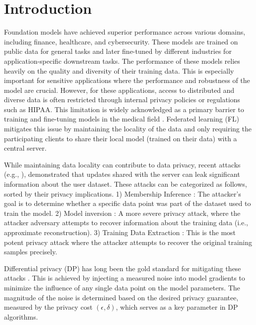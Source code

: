 \section{Introduction}
Foundation models have achieved superior performance across various domains, including finance, healthcare, and cybersecurity. 
%
These models are trained on public data for general tasks and later fine-tuned by different industries for application-specific downstream tasks. 
The performance of these models relies heavily on the quality and diversity of their training data.
%
This is especially important for sensitive applications where the performance and robustness of the model are crucial.
%
However, for these applications, access to distributed and diverse data is often restricted through internal privacy policies or regulations such as HIPAA. 
%
This limitation is widely acknowledged as a primary barrier to training and fine-tuning models in the medical field \cite{liu2024moe}. 
%
Federated learning (FL) mitigates this issue by maintaining the locality of the data and only requiring the participating clients to share their local model (trained on their data) with a central server. 
%

While maintaining data locality can contribute to data privacy, recent attacks (e.g., \cite{balle2022reconstructing,hayes2024bounding}), demonstrated that updates shared with the server can leak significant information about the user dataset. 
%
These attacks can be categorized as follows, sorted by their privacy implications.
%
1) Membership Inference \cite{nasr2018machine, yeom2018privacy}: The attacker's goal is to determine whether a specific data point was part of the dataset used to train the model. 
%
2) Model inversion \cite{carlini2019secret}: A more severe privacy attack, where the attacker adversary attempts to recover information about the training data (i.e., approximate reconstruction). 
%
3) Training Data Extraction \cite{carlini2021extracting}: This is the most potent privacy attack where the attacker attempts to recover the original training samples precisely.

Differential privacy (DP) has long been the gold standard for mitigating these attacks \cite{dwork2006calibrating}. 
%
This is achieved by injecting a measured noise into model gradients to minimize the influence of any single data point on the model parameters. 
%
The magnitude of the noise is determined based on the desired privacy guarantee, measured by the privacy cost $(\epsilon,\delta)$, which serves as a key parameter in DP algorithms. 

